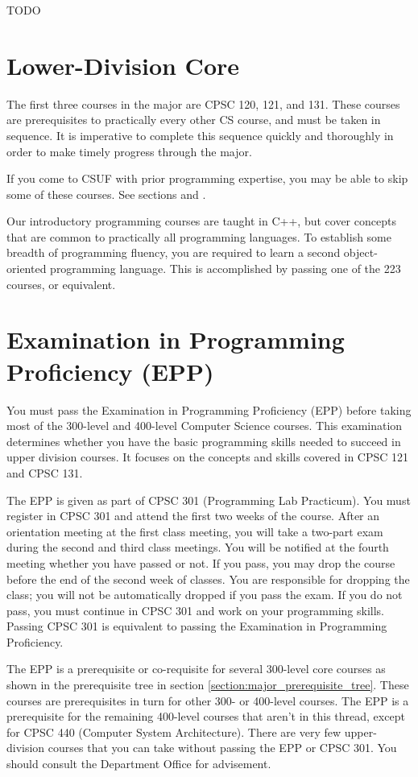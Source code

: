 \documentclass{book}
\begin{document}
TODO

\section{Lower-Division Core}
The first three courses in the major are CPSC 120, 121, and 131. These courses are prerequisites to practically every other CS course, and must be taken in sequence. It is imperative to complete this sequence quickly and thoroughly in order to make timely progress through the major.

If you come to CSUF with prior programming expertise, you may be able to skip some of these courses. See sections  and .

Our introductory programming courses are taught in C++, but cover concepts that are common to practically all programming languages. To establish some breadth of programming fluency, you are required to learn a second object-oriented programming language. This is accomplished by passing one of the 223 courses, or equivalent.

\section{Examination in Programming Proficiency (EPP)}
You must pass the Examination in Programming Proficiency (EPP) before taking most of the 300-level and 400-level Computer Science courses. This examination determines whether you have the basic programming skills needed to succeed in upper division courses. It focuses on the concepts and skills covered in CPSC 121 and CPSC 131.

The EPP is given as part of CPSC 301 (Programming Lab Practicum). You must register in CPSC 301 and attend the first two weeks of the course. After an orientation meeting at the first class meeting, you will take a two-part exam during the second and third class meetings. You will be notified at the fourth meeting whether you have passed or not. If you pass, you may drop the course before the end of the second week of classes. You are responsible for dropping the class; you will not be automatically dropped if you pass the exam. If you do not pass, you must continue in CPSC 301 and work on your programming skills. Passing CPSC 301 is equivalent to passing the Examination in Programming Proficiency.

The EPP is a prerequisite or co-requisite for several 300-level core courses as shown in the prerequisite tree in section \ref{section:major_prerequisite_tree}. These courses are prerequisites in turn for other 300- or 400-level courses. The EPP is a prerequisite for the remaining 400-level courses that aren’t in this thread, except for CPSC 440 (Computer System Architecture). There are very few upper-division courses that you can take without passing the EPP or CPSC 301. You should consult the Department Office for advisement.
\end{document}
